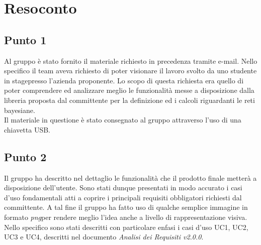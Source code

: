 \section{Resoconto}

\subsection{Punto 1}
Al gruppo è stato fornito il materiale richiesto in precedenza tramite e-mail.
Nello specifico il team aveva richiesto di poter visionare il lavoro svolto da uno studente in stage\glossario presso l'azienda proponente. Lo scopo di questa richiesta era quello di poter comprendere ed analizzare meglio le funzionalità messe a disposizione dalla libreria proposta dal committente per la definizione ed i calcoli riguardanti le reti bayesiane.\\
Il materiale in questione è stato consegnato al gruppo attraverso l'uso di una chiavetta USB.

\subsection{Punto 2}
Il gruppo ha descritto nel dettaglio le funzionalità che il prodotto finale metterà a disposizione dell'utente. Sono stati dunque presentati in modo accurato i casi d'uso fondamentali atti a coprire i principali requisiti obbligatori richiesti dal committente. A tal fine il gruppo ha fatto uso di qualche semplice immagine in formato \textit{png}\glossario per rendere meglio l'idea anche a livello di rappresentazione visiva.\\
Nello specifico sono stati descritti con particolare enfasi i casi d'uso UC1, UC2, UC3 e UC4, descritti nel documento \textit{Analisi dei Requisiti v2.0.0}.

